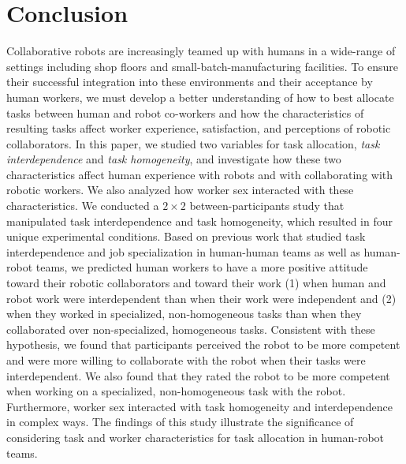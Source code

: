 \section{Conclusion}
Collaborative robots are increasingly teamed up with humans in a wide-range of settings including shop floors and small-batch-manufacturing facilities. To ensure their successful integration into these environments and their acceptance by human workers, we must develop a better understanding of how to best allocate tasks between human and robot co-workers and how the characteristics of resulting tasks affect worker experience, satisfaction, and perceptions of robotic collaborators. In this paper, we studied two variables for task allocation, \textit{task interdependence} and \textit{task homogeneity}, and investigate how these two characteristics affect human experience with robots and with collaborating with robotic workers. We also analyzed how worker sex interacted with these characteristics. We conducted a $2\times2$ between-participants study that manipulated task interdependence and task homogeneity, which resulted in four unique experimental conditions. Based on previous work that studied task interdependence and job specialization in  human-human teams as well as human-robot teams, we predicted human workers to have a more positive attitude toward their robotic collaborators and toward their work (1) when human and robot work were interdependent than when their work were independent and (2) when they worked in specialized, non-homogeneous tasks than when they collaborated over non-specialized, homogeneous tasks. Consistent with these hypothesis, we found that participants perceived the robot to be more competent and were more willing to collaborate with the robot when their tasks were interdependent. We also found that they rated the robot to be more competent when working on a specialized, non-homogeneous task with the robot. Furthermore, worker sex interacted with task homogeneity and interdependence in complex ways. The findings of this study illustrate the significance of considering task and worker characteristics for task allocation in human-robot teams.